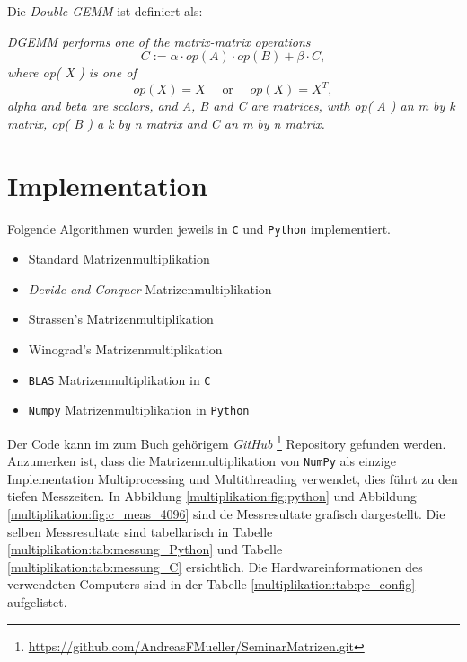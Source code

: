 Die \textit{Double-GEMM} \cite{multiplikation:DGEMM} ist definiert als:

\textit{DGEMM  performs one of the matrix-matrix operations}
$$
 C := \alpha \cdot op( A )\cdot op( B ) + \beta \cdot C,
 $$
 \textit{where  op( X ) is one of}
$$
op( X ) = X  \quad \text{ or } \quad  op( X ) = X^T,
$$
 \textit{alpha and beta are scalars, and A, B and C are matrices, with op( A )
 an m by k matrix,  op( B )  a  k by n matrix and  C an m by n matrix.
 }




\section{Implementation}\label{multiplikation:section:Implementation}

Folgende Algorithmen wurden jeweils in \texttt{C} und \texttt{Python} implementiert.
\begin{itemize}
	\item Standard Matrizenmultiplikation
	\item \textit{Devide and Conquer} Matrizenmultiplikation
	\item Strassen's Matrizenmultiplikation
	\item Winograd's Matrizenmultiplikation
	\item \texttt{BLAS} Matrizenmultiplikation in \texttt{C}
	\item \texttt{Numpy} Matrizenmultiplikation in \texttt{Python}
\end{itemize}

Der Code kann im zum Buch gehörigem \textit{GitHub} \footnote{\url{https://github.com/AndreasFMueller/SeminarMatrizen.git}} Repository gefunden werden.
Anzumerken ist, dass die Matrizenmultiplikation von \texttt{NumPy} als einzige Implementation Multiprocessing und Multithreading verwendet, dies f\"uhrt zu den tiefen Messzeiten.
In Abbildung \ref{multiplikation:fig:python} und Abbildung \ref{multiplikation:fig:c_meas_4096} sind de Messresultate grafisch dargestellt. Die selben Messresultate sind tabellarisch in Tabelle \ref{multiplikation:tab:messung_Python} und Tabelle \ref{multiplikation:tab:messung_C} ersichtlich.
Die Hardwareinformationen des verwendeten Computers sind in der Tabelle \ref{multiplikation:tab:pc_config} aufgelistet.


